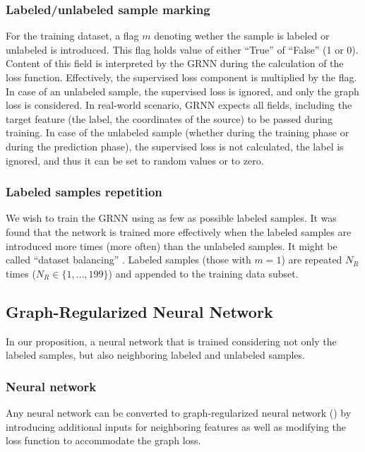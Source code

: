 \documentclass[applsci,article,submit,moreauthors,pdftex]{Definitions/mdpi}
\begin{document}
\subsubsection{Labeled/unlabeled sample marking}
For the training dataset, a flag $ m $ denoting wether the sample is labeled or unlabeled is introduced. This flag holds value of either ``True'' of ``False'' (1 or 0). Content of this field is interpreted by the GRNN during the calculation of the loss function. Effectively, the supervised loss component is multiplied by the flag. In case of an unlabeled sample, the supervised loss is ignored, and only the graph loss is considered. In real-world scenario, GRNN expects all fields, including the target feature (the label, the coordinates of the source) to be passed during training. In case of the unlabeled sample (whether during the training phase or during the prediction phase), the supervised loss is not calculated, the label is ignored, and thus it can be set to random values or to zero. 

\subsubsection{Labeled samples repetition}
We wish to train the GRNN using as few as possible labeled samples. It was found that the network is trained more effectively when the labeled samples are introduced more times (more often) than the unlabeled samples. It might be called ``dataset balancing'' \cite{}. 
Labeled samples (those with $ m =  1 $) are repeated $ N_R $ times ($ N_R \in \{1,\dots,199\}$) and appended to the training data subset.

\subsection{Graph-Regularized Neural Network}

In our proposition, a neural network that is trained considering not only the labeled samples, but also neighboring labeled and unlabeled samples.

\subsubsection{Neural network}

Any neural network can be converted to graph-regularized neural network (\grnn) by introducing additional inputs for neighboring features as well as modifying the loss function to accommodate the graph loss.
\end{document}
